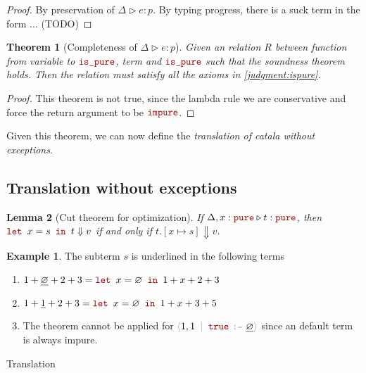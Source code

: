 \documentclass{scrartcl}
\newtheorem{theorem}{Theorem}
\newtheorem{lemma}[theorem]{Lemma}
\theoremstyle{definition}
\newtheorem{example}{Example}
\begin{document}
\begin{proof}
    By preservation of $\Delta \triangleright e : p$. By typing progress, there is a suck term in the form ... (TODO)
\end{proof}

\begin{theorem}[Completeness of $\Delta \triangleright e: p$]
    Given an relation $R$ between function from variable to $\synispure$, term and $\synispure$ such that the soundness theorem holds. Then the relation must satisfy all the axioms in \cref{judgment:ispure}.
\end{theorem}

\begin{proof}
    This theorem is not true, since the lambda rule we are conservative and force the return argument to be $\synimpure$.
\end{proof}


Given this theorem, we can now define the \emph{translation of catala without exceptions}.

\subsection{Translation without exceptions}

\begin{lemma}[Cut theorem for optimization]
    If $\Delta, x: \synpure \triangleright t : \synpure$, then $\synlet x = s \synin t \Downarrow v$ if and only if $t.[x \mapsto s] \Downarrow v$.
\end{lemma}

\begin{example}
    The subterm $s$ is underlined in the following terms
    \begin{enumerate}
        \item $1 + \underline{\synempty} + 2 + 3 = \synlet x = \synempty \synin 1 + x + 2 + 3$
        \item $1 + \underline{1} + 2 + 3 = \synlet x = \synempty \synin 1 + x + 3 + 5$
        \item The theorem cannot be applied for $\synlangle 1, 1 \synmid  \syntrue \synjust \underline{\synempty} \synrangle$ since an default term is always impure.
    \end{enumerate}
\end{example}


Translation

\begin{figure}
    \begin{mathpar}

    \end{mathpar}
\end{figure}
\end{document}

